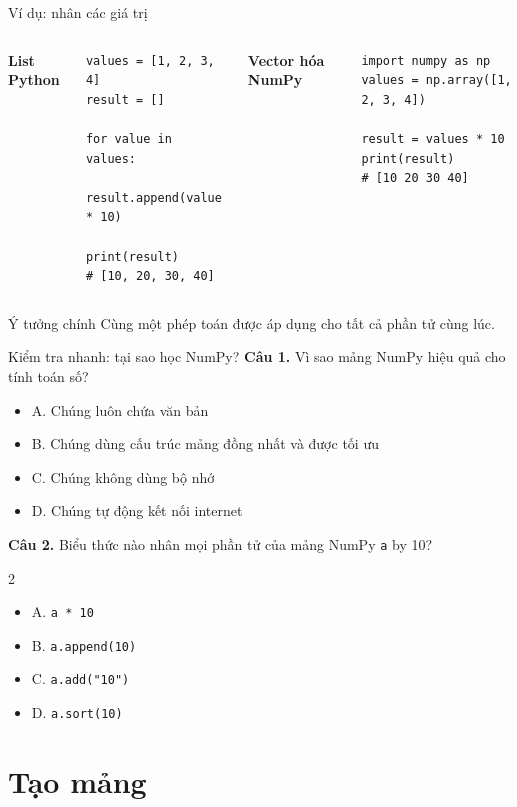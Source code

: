 \documentclass[aspectratio=169,11pt]{beamer}
\newcommand{\quiztitle}[1]{\textbf{\textcolor{QuizOrange}{#1}}}
\begin{document}
\begin{frame}[fragile]{Ví dụ: nhân các giá trị}
\begin{columns}[T]
\textbf{List Python}
\begin{lstlisting}[style=py]
values = [1, 2, 3, 4]
result = []

for value in values:
    result.append(value * 10)

print(result)
# [10, 20, 30, 40]
\end{lstlisting}
\textbf{Vector hóa NumPy}
\begin{lstlisting}[style=py]
import numpy as np
values = np.array([1, 2, 3, 4])

result = values * 10
print(result)
# [10 20 30 40]
\end{lstlisting}
\end{columns}
\begin{block}{Ý tưởng chính}
Cùng một phép toán được áp dụng cho tất cả phần tử cùng lúc.
\end{block}
\end{frame}

\begin{frame}{Kiểm tra nhanh: tại sao học NumPy?}
\small
\quiztitle{Câu 1.} Vì sao mảng NumPy hiệu quả cho tính toán số?
\begin{itemize}
  \item A. Chúng luôn chứa văn bản
  \item B. Chúng dùng cấu trúc mảng đồng nhất và được tối ưu
  \item C. Chúng không dùng bộ nhớ
  \item D. Chúng tự động kết nối internet
\end{itemize}
\vspace{0.6em}
\quiztitle{Câu 2.} Biểu thức nào nhân mọi phần tử của mảng NumPy \texttt{a} by 10?
\begin{multicols}{2}
\begin{itemize}
  \item A. \texttt{a * 10}
  \item B. \texttt{a.append(10)}
  \item C. \texttt{a.add("10")}
  \item D. \texttt{a.sort(10)}
\end{itemize}
\end{multicols}
\end{frame}

\section{Tạo mảng}
\end{document}
